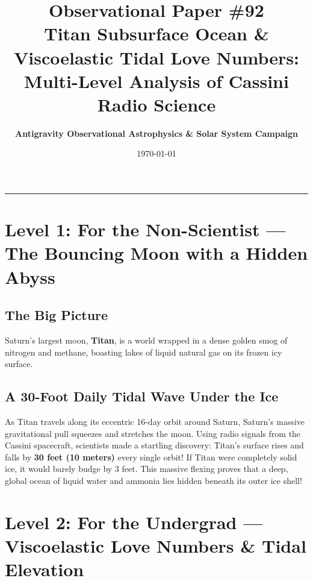 \documentclass[11pt,a4paper]{article}
\title{\Huge \textbf{Observational Paper \#92}\\ \Large Titan Subsurface Ocean \& Viscoelastic Tidal Love Numbers: Multi-Level Analysis of Cassini Radio Science}
\author{\textbf{Antigravity Observational Astrophysics \& Solar System Campaign}}
\date{\today}
\begin{document}
\maketitle

\vspace{-1em}
\begin{center}
\rule{\textwidth}{1.5pt}
\end{center}

\section*{Level 1: For the Non-Scientist — The Bouncing Moon with a Hidden Abyss}

\subsection*{The Big Picture}
Saturn's largest moon, \textbf{Titan}, is a world wrapped in a dense golden smog of nitrogen and methane, boasting lakes of liquid natural gas on its frozen icy surface.

\subsection*{A 30-Foot Daily Tidal Wave Under the Ice}
As Titan travels along its eccentric 16-day orbit around Saturn, Saturn's massive gravitational pull squeezes and stretches the moon. Using radio signals from the Cassini spacecraft, scientists made a startling discovery: Titan's surface rises and falls by \textbf{30 feet (10 meters)} every single orbit! If Titan were completely solid ice, it would barely budge by 3 feet. This massive flexing proves that a deep, global ocean of liquid water and ammonia lies hidden beneath its outer ice shell!

\newpage

\section*{Level 2: For the Undergrad — Viscoelastic Love Numbers \& Tidal Elevation}
\end{document}
